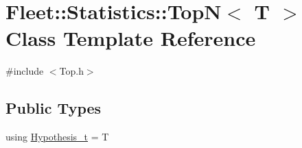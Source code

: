 \hypertarget{class_fleet_1_1_statistics_1_1_top_n}{}\section{Fleet\+:\+:Statistics\+:\+:TopN$<$ T $>$ Class Template Reference}
\label{class_fleet_1_1_statistics_1_1_top_n}


{\ttfamily \#include $<$Top.\+h$>$}

\subsection*{Public Types}
\begin{DoxyCompactItemize}
\item 
using \hyperlink{class_fleet_1_1_statistics_1_1_top_n_af115f2778a79fca8e1f499d351af1b8b}{Hypothesis\+\_\+t} = T
\end{DoxyCompactItemize}
